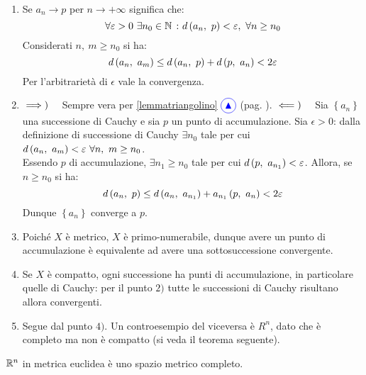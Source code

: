 \begin{demonstration}~{}
	\begin{enumerate}[label=\Roman*]
		\item Se $a_n\to p$ per $n\to +\infty$ significa che:
		\begin{equation*}
			\forall \epsilon>0\ \exists n_0\in\naturalset\ \colon \mvf{d}{a_n}{p}<\epsilon,\ \forall n\geq n_0
		\end{equation*}
	Considerati $n,\ m\geq n_0$ si ha:
	\begin{equation}
		d\left(a_n,\ a_m\right)\leq d\left(a_n,\ p\right)+d\left(p,\ a_n\right)< 2\varepsilon
	\end{equation}
Per l'arbitrarietà di $\epsilon$ vale la convergenza.
\item $\implies)\quad$ Sempre vera per  \ref{lemmatriangolino} $\textcolor{blue}{\circled{{\large \blacktriangle}}}$ (pag. \pageref{lemmatriangolino}).
$\impliedby)\quad$ Sia $\left\{a_n\right\}$ una successione di Cauchy e sia $p$ un punto di accumulazione. Sia $\epsilon>0$: dalla definizione di successione di Cauchy $\exists n_0$ tale per cui $\mvf{d}{a_n}{a_m}<\epsilon\ \forall n,\ m\geq n_0$.\\
Essendo $p$ di accumulazione, $\exists n_1\geq n_0$ tale per cui $d\left(p,\ a_{n_1}\right)<\varepsilon$. Allora, se $n\geq n_0$ si ha:
	\begin{equation*}
	d\left(a_n,\ p\right)\leq d\left(a_n,\ a_{n_1}\right)+a_{n_1}\left(p,\ a_n\right)< 2\varepsilon
\end{equation*}
Dunque $\left\{a_n\right\}$ converge a $p$.
\item Poiché $X$ è metrico, $X$ è primo-numerabile, dunque avere un punto di accumulazione è equivalente ad avere una sottosuccessione convergente.
\item Se $X$ è compatto, ogni successione ha punti di accumulazione, in particolare quelle di Cauchy: per il punto $2)$ tutte le successioni di Cauchy risultano allora convergenti.
\item Segue dal punto $4)$. Un controesempio del viceversa è $R^n$, dato che è completo ma non è compatto (si veda il teorema seguente). 
\end{enumerate}
\end{demonstration}
\begin{theorema}
	$\mathbb{R}^n$ in metrica euclidea è uno spazio metrico completo.
\end{theorema}
